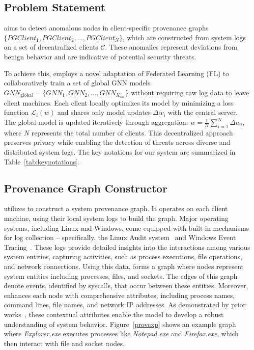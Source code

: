 \subsection{Problem Statement}

\Sys aims to detect anomalous nodes in client-specific provenance graphs \( \{PGClient_{1}, PGClient_{2}, \ldots, PGClient_{N}\} \), which are constructed from system logs on a set of decentralized clients \( \mathcal{C} \). These anomalies represent deviations from benign behavior and are indicative of potential security threats.

To achieve this, \Sys employs a novel adaptation of Federated Learning (FL) to collaboratively train a set of global GNN models \( {GNN}_{\text{global}} = \{GNN_1, GNN_2, \ldots, GNN_{K_{cat}}\} \) without requiring raw log data to leave client machines. Each client locally optimizes its model by minimizing a loss function \( \mathcal{L}_i(w) \) and shares only model updates \( \Delta w_i \) with the central server. The global model is updated iteratively through aggregation: \( w = \frac{1}{N} \sum_{i=1}^{N} \Delta w_i, \)
where \( N \) represents the total number of clients. This decentralized approach preserves privacy while enabling the detection of threats across diverse and distributed system logs. The key notations for our system are summarized in Table~\ref{tab:keynotations}.



\subsection{Provenance Graph Constructor}
\label{sub:provconstruct}

\Sys utilizes \logs to construct a system provenance graph. It operates on each client machine, using their local system logs to build the graph. Major operating systems, including Linux and Windows, come equipped with built-in mechanisms for log collection -- specifically, the Linux Audit system~\cite{linuxaudit} and Windows Event Tracing~\cite{windowsaudit}. These logs provide detailed insights into the interactions among various system entities, capturing activities, such as process executions, file operations, and network connections. Using this data, \Sys forms a graph where nodes represent system entities including processes, files, and sockets. The edges of this graph denote events, identified by syscalls, that occur between these entities. Moreover, \Sys enhances each node with comprehensive attributes, including process names, command lines, file names, and network IP addresses. As demonstrated by prior works~\cite{flash2024,cheng2023kairos}, these contextual attributes enable the model to develop a robust understanding of system behavior. Figure~\ref{provexp} shows an example graph where \textit{Explorer.exe} executes processes like \textit{Notepad.exe} and \textit{Firefox.exe}, which then interact with file and socket nodes.



